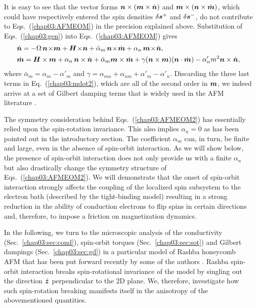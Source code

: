 It is easy to see that the vector forms $\boldsymbol{n}\times(\boldsymbol{m}\times\dot{\boldsymbol{n}})$ and $\boldsymbol{m}\times(\boldsymbol{n}\times \dot{\boldsymbol{m}})$, which could have respectively entered the spin densities $\delta\boldsymbol{s}^+$ and $\delta\boldsymbol{s}^-$, do not contribute to Eqs.~(\ref{chap03:AFMEOM}) in the precision explained above.  
Substitution of Eqs.~(\ref{chap03:gen}) into Eqs.~(\ref{chap03:AFMEOM}) gives 
\beml
\label{chap03:AFMEOM2}
\begin{align}
\label{chap03:ndot2}
&\dot{\bb{n}} = -\Omega\, \bb{n}\!\times\!\bb{m} +\bb{H}\!\times\!\bb{n}+\bar{\alpha}_m\,\bb{n}\!\times\!\dot{\bb{m}}+\alpha_n\,\bb{m}\!\times\! \dot{\bb{n}},\\
&\dot{\bb{m}} =\bb{H}\times\bb{m}+\alpha_n\,\bb{n} \times \dot{\bb{n}}+\bar{\alpha}_m \bb{m} \times \dot{\bb{m}} +\gamma (\bb{n}\times\bb{m})(\bb{n}\cdot\dot{\bb{m}}) - \alpha_n'm^2\bb{n}\times\dot{\bb{n}},
\label{chap03:mdot2}
\end{align}
\eml
where $\bar{\alpha}_m=\alpha_m\!-\!\alpha'_m$ and $\gamma=\alpha_{mn}\!+\!\alpha_{nm}\!+\!\alpha'_m\!-\!\alpha'_n$. Discarding the three last terms in Eq.~(\ref{chap03:mdot2}), which are all of the second order in $\boldsymbol{m}$, we indeed arrive at a set of Gilbert damping terms that is  widely used in the AFM literature \cite{Kamra2018,PhysRevMaterials.1.061401,Yuan_2019}. 

The symmetry consideration behind Eqs.~(\ref{chap03:AFMEOM2}) has essentially relied upon the spin-rotation invariance. This also implies $\alpha_n=0$ as has been pointed out in the introductory section. The coefficient $\alpha_m$ can, in turn, be finite and large, even in the absence of spin-orbit interaction. As we will show below, the presence of spin-orbit interaction does not only provide us with a finite $\alpha_n$ but also drastically change the symmetry structure of Eqs.~(\ref{chap03:AFMEOM2}). We will demonstrate that the onset of spin-orbit interaction strongly affects the coupling of the localized spin subsystem to the electron bath (described by the tight-binding model) resulting in a strong reduction in the ability of conduction electrons to flip spins in certain directions and, therefore, to impose a friction on magnetization dynamics. 

In the following, we turn to the microscopic analysis of the conductivity (Sec.~\ref{chap03:sec:cond}), spin-orbit torques (Sec.~\ref{chap03:sec:sot}) and Gilbert dampings (Sec.~\ref{chap03:sec:gd}) in a particular model of Rashba honeycomb AFM that has been put forward recently by some of the authors \cite{sumit2019}. Rashba spin-orbit interaction breaks spin-rotational invariance of the model by singling out the direction $\hat{\boldsymbol{z}}$ perpendicular to the 2D plane. We, therefore, investigate how such spin-rotation breaking manifests itself in the anisotropy of the abovementioned quantities.  

